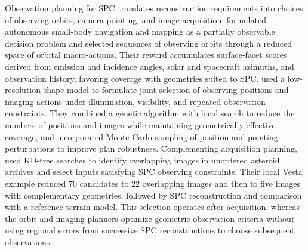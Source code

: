 Observation planning for SPC translates reconstruction requirements into choices of observing orbits, camera pointing, and image acquisition. \citet{pesce2018mapping} formulated autonomous small-body navigation and mapping as a partially observable decision problem and selected sequences of observing orbits through a reduced space of orbital macro-actions. Their reward accumulates surface-facet scores derived from emission and incidence angles, solar and spacecraft azimuths, and observation history, favoring coverage with geometries suited to SPC. \citet{wang2025} used a low-resolution shape model to formulate joint selection of observing positions and imaging actions under illumination, visibility, and repeated-observation constraints. They combined a genetic algorithm with local search to reduce the numbers of positions and images while maintaining geometrically effective coverage, and incorporated Monte Carlo sampling of position and pointing perturbations to improve plan robustness. Complementing acquisition planning, \citet{zhang2025imagepairs} used KD-tree searches to identify overlapping images in unordered asteroid archives and select inputs satisfying SPC observing constraints. Their local Vesta example reduced 70 candidates to 22 overlapping images and then to five images with complementary geometries, followed by SPC reconstruction and comparison with a reference terrain model. This selection operates after acquisition, whereas the orbit and imaging planners optimize geometric observation criteria without using regional errors from successive SPC reconstructions to choose subsequent observations.

